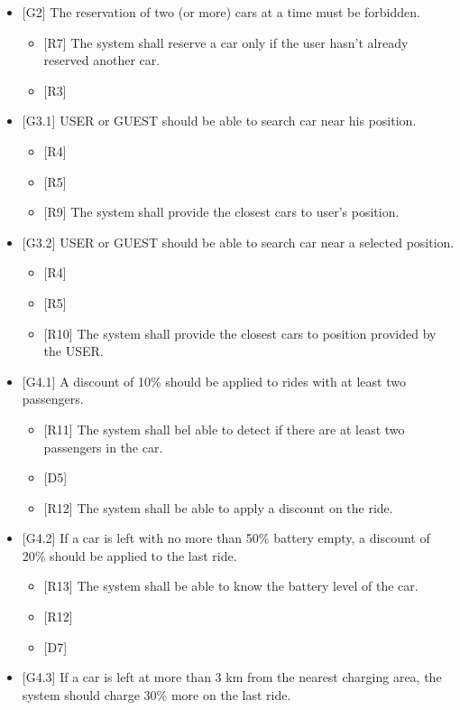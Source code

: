 \begin{itemize}
\item {[}G2{]} The reservation of two (or more) cars at a time must be forbidden.
\begin{itemize}
\item {[}R7{]} The system shall reserve a car only if the user hasn't already
reserved another car.
\item {[}R3{]}
\end{itemize}
\item {[}G3.1{]} USER or GUEST should be able to search car near his position.
\begin{itemize}
\item {[}R4{]}
\item {[}R5{]}
\item {[}R9{]} The system shall provide the closest cars to user's position.
\end{itemize}
\item {[}G3.2{]} USER or GUEST should be able to search car near a selected
position.
\begin{itemize}
\item {[}R4{]}
\item {[}R5{]}
\item {[}R10{]} The system shall provide the closest cars to position provided
by the USER.
\end{itemize}
\item {[}G4.1{]} A discount of 10\% should be applied to rides with at least
two passengers. 
\begin{itemize}
\item {[}R11{]} The system shall bel able to detect if there are at least
two passengers in the car.
\item {[}D5{]}
\item {[}R12{]} The system shall be able to apply a discount on the ride.
\end{itemize}
\item {[}G4.2{]} If a car is left with no more than 50\% battery empty,
a discount of 20\% should be applied to the last ride.
\begin{itemize}
\item {[}R13{]} The system shall be able to know the battery level of the
car.
\item {[}R12{]}
\item {[}D7{]}
\end{itemize}
\item {[}G4.3{]} If a car is left at more than 3 km from the nearest charging
area, the system should charge 30\% more on the last ride.
\begin{itemize}

\end{itemize}
\end{itemize}

